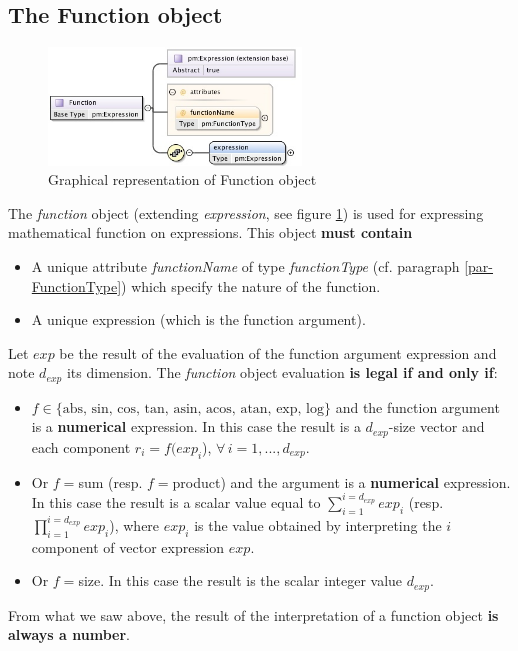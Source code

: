 \documentclass[a4paper,11pt] {article}
\begin{document}
\subsection{The Function object}\label{par02_05}
\begin{figure}[htbp]
\begin{center}
\includegraphics[width=0.6\textwidth]{pictures/Function.jpg} 
\caption{Graphical representation of Function object}
\label{Pic-Function}
\end{center}
\end{figure}
The {\it function} object (extending {\it expression}, see figure \ref{Pic-Function}) is used for
expressing mathematical function on expressions.
This object {\bf must contain} 
\begin{itemize}
\item A unique attribute {\it functionName} of type {\it functionType} (cf. paragraph
\ref{par-FunctionType}) which specify the nature of the function.
\item A unique expression (which is the function argument).\\
\end{itemize}
Let $exp$ be the result of the evaluation of the function argument expression and note $d_{exp}$ its
dimension.
The {\it function} object evaluation {\bf is legal if and only if}:
\begin{itemize}
\item $f  \in \{ \mbox{abs, sin, cos, tan, asin, acos, atan, exp, log} \}$ and the function argument
is a {\bf numerical} expression. In this case the  result  is a $d_{exp}$-size vector and each
component  $r_i = f(exp_i$), $\forall \, i=1,...,d_{exp}$.
\item Or $f=$sum (resp. $f=$product) and the argument is a {\bf numerical} expression. In this case
the result is a scalar value equal to $\sum_{i=1}^{i=d_{exp}} exp_i$ (resp. $\prod
_{i=1}^{i=d_{exp}} exp_i$), where $exp_i$ is the value obtained
by interpreting the $i$ component of vector expression $exp$.
\item Or $f=$size. In this case the result is the scalar integer value $d_{exp}$. 
\end{itemize}
From what we saw above, the result of the interpretation of a function object { \bf is always a number}.
\end{document}
